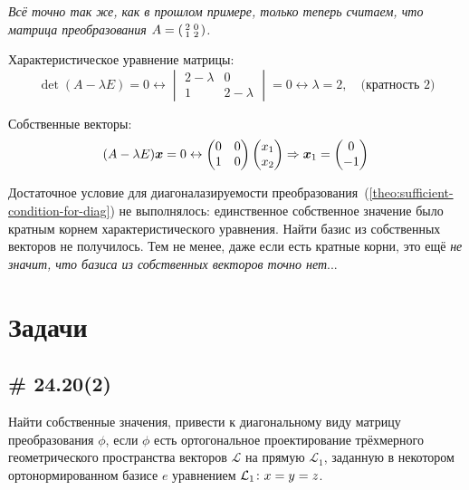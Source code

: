 \documentclass[a4paper,12pt]{article}
\begin{document}
  \begin{example}
    \emph{
      Всё точно так же, как в прошлом примере, только теперь считаем, что матрица преобразования $A \hm= \left(\begin{smallmatrix} 2 & 0 \\ 1 & 2 \end{smallmatrix}\right)$.
    }
    
    \bigskip
    
    Характеристическое уравнение матрицы:
    \[
      \det(A - \lambda E) = 0
      \leftrightarrow \begin{vmatrix}
        2 - \lambda & 0\\
        1 & 2 - \lambda
      \end{vmatrix} = 0
      \leftrightarrow \lambda = 2,\quad \mbox{(кратность $2$)}
    \]
    
    Собственные векторы:
    \[
      (A - \lambda E) \boldsymbol x = 0 \leftrightarrow \begin{pmatrix}
        0 & 0\\
        1 & 0
      \end{pmatrix} \begin{pmatrix}
        x_1\\
        x_2
      \end{pmatrix} \Rightarrow \boldsymbol x_1 = \begin{pmatrix}
        0\\
        -1
      \end{pmatrix}
    \]
    
    Достаточное условие для диагоналазируемости преобразования~(\ref{theo:sufficient-condition-for-diag}) не выполнялось: единственное собственное значение было кратным корнем характеристического уравнения.
    Найти базис из собственных векторов не получилось.
    Тем не менее, даже если есть кратные корни, это ещё \emph{не значит, что базиса из собственных векторов точно нет}...
  \end{example}
  
  
  \section{Задачи}
  
  \subsection{\# 24.20(2)}
  
  Найти собственные значения, привести к диагональному виду матрицу преобразования $\phi$, если $\phi$ есть ортогональное проектирование трёхмерного геометрического пространства векторов $\mathcal L$ на прямую $\mathcal L_1$, заданную в некотором ортонормированном базисе $e$ уравнением $\mathcal L_1\colon x\hm= y \hm= z$.
  
\end{document}
